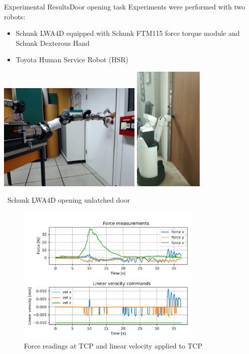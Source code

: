 \documentclass[aspectratio=43,10pt,fleqn,t]{beamer}
\begin{document}
\begin{frame}{Experimental Results}{\small Door opening task}
	\vspace{-0.5cm}
Experiments were performed with two robots:
\begin{itemize}
	\small
	\item Schunk LWA4D equipped with Schunk FTM115 force torque module and Schunk Dexterous Hand 
	\item Toyota Human Service Robot (HSR)
\end{itemize}
	\centering
	\includegraphics[width=0.52\textwidth]{images/exp/lwa_door}
	\hfil
	\includegraphics[width=0.25\textwidth]{images/exp/hsr_door} 
\end{frame}

\begin{frame}{~}{\small Schunk LWA4D opening unlatched door}
	\vspace{-1cm}
\begin{figure}[h]
	\centering
	\includegraphics[width=0.8\textwidth]{images/exp/f-vn.pdf}
	\caption{Force readings at TCP and linear velocity applied to TCP}
	\label{EX:f-v}
\end{figure}
\end{frame}
\end{document}
